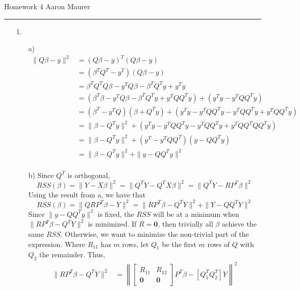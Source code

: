 \documentclass[11pt]{article}
\theoremstyle{definition}
\begin{document}
Homework 4 \hfill Aaron Maurer
\vspace{2mm}
\hrule
\vspace{2mm}
\begin{itemize}
    \item[1.]
        \begin{itemize}
            \item[a)]
                \begin{align*}
                    \|Q\beta - y\|^2 &= (Q\beta - y)^T(Q\beta - y) \\                
                                     &= (\beta^T Q^T - y^T)(Q\beta - y) \\
                                     &= \beta^TQ^TQ\beta - y^TQ\beta - \beta^T Q^T y + y^Ty  \\
                                     &= (\beta^T\beta - y^TQ\beta - \beta^T Q^T y + y^TQQ^Ty) + (y^Ty - y^TQQ^Ty) \\
                                     &= (\beta^T - y^TQ)(\beta + Q^Ty) + (y^Ty - y^TQQ^Ty- y^TQQ^Ty + y^TQQ^Ty) \\
                                     &= \|\beta - Q^Ty\|^2 + (y^Ty - y^TQQ^Ty- y^TQQ^Ty + y^TQQ^TQQ^Ty) \\
                                     &= \|\beta - Q^Ty\|^2 + (y^T - y^TQQ^T)(y - QQ^Ty)\\
                                     &= \|\beta - Q^Ty\|^2 + \|y - QQ^Ty\|^2\\
                \end{align*}
            \item[b)]
                Since $Q^T$ is orthogonal,
                \[RSS(\beta) = \|Y-X\beta\|^2 = \|Q^TY-Q^TX\beta\|^2 = \|Q^TY - RP^T\beta\|^2 \]
                Using the result from a, we have that
                \[RSS(\beta) = \|QRP^T\beta - Y\|^2 = \|RP^T\beta-Q^TY\|^2 + \|Y-QQ^TY\|^2 \]
                Since \(\|y-QQ^Ty\|^2\) is fixed, the $RSS$ will be at a minimum when \(\|RP^T\beta-Q^TY\|^2\) is minimized. If \(R=\mathbf{0}\), then trivially all \(\beta\) achieve the same $RSS$. Otherwise, we want to minimize the non-trivial part of the expression. Where $R_{11}$ has $m$ rows, let $Q_1$ be the first $m$ rows of $Q$ with $Q_2$ the remainder. Thus, 
                \begin{align*}
                \|RP^T\beta-Q^TY\|^2 &= \left\| \left[\begin{array}{cc} R_{11} & R_{12} \\ \mathbf{0} & \mathbf{0} \end{array} \right] P^T \beta - [Q_1^T Q_2^T]Y \right \|^2 \\

\end{align*}
\end{itemize}
\end{itemize}
\end{document}
